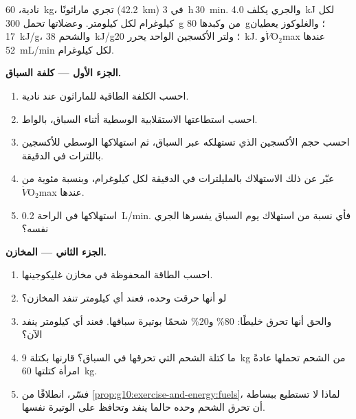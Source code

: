 \begin{problem}
\label{pb:g10:exercise-and-energy:1}
نادية، \qty{60}{kg}، تجري ماراثونًا (\qty{42.2}{km}) في
\qty{3}{h}\,\qty{30}{min}. والجري يكلف \qty{4.0}{kJ} لكل كيلوغرام لكل
كيلومتر. وعضلاتها تحمل \qty{300}{g} من  وكبدها \qty{80}{g}؛
 والغلوكوز يعطيان \qty{17}{kJ/g}، والشحم \qty{38}{kJ/g}؛
ولتر الأكسجين الواحد يحرر \qty{20}{kJ}. و$\dot V\!\mathrm{O_2}$max
عندها \qty{52}{mL/min} لكل كيلوغرام.

\medskip
\noindent\textbf{الجزء الأول --- كلفة السباق.}
\begin{enumerate}
  \item احسب الكلفة الطاقية للماراثون عند نادية.
  \item احسب استطاعتها الاستقلابية الوسطية أثناء السباق، بالواط.
  \item احسب حجم الأكسجين الذي تستهلكه عبر السباق، ثم استهلاكها
        الوسطي للأكسجين باللترات في الدقيقة.
  \item عبّر عن ذلك الاستهلاك بالمليلترات في الدقيقة لكل كيلوغرام،
        وبنسبة مئوية من $\dot V\!\mathrm{O_2}$max عندها.
  \item استهلاكها في الراحة \qty{0.2}{L/min}. فأي نسبة من استهلاك يوم
        السباق يفسرها الجري نفسه؟
\end{enumerate}

\medskip
\noindent\textbf{الجزء الثاني --- المخازن.}
\begin{enumerate}[resume]
  \item احسب الطاقة المحفوظة في مخازن غليكوجينها.
  \item لو أنها حرقت  وحده، فعند أي كيلومتر تنفد المخازن؟
  \item والحق أنها تحرق خليطًا: 80\%  و20\% شحمًا بوتيرة
        سباقها. فعند أي كيلومتر ينفد  الآن؟
  \item ما كتلة الشحم التي تحرقها في السباق؟ قارنها بكتلة \qty{9}{kg} من
        الشحم تحملها عادةً امرأة كتلتها \qty{60}{kg}.
  \item فسّر، انطلاقًا من \cref{prop:g10:exercise-and-energy:fuels}،
        لماذا لا تستطيع ببساطة أن تحرق الشحم وحده حالما ينفد
         وتحافظ على الوتيرة نفسها.
\end{enumerate}


\end{problem}
